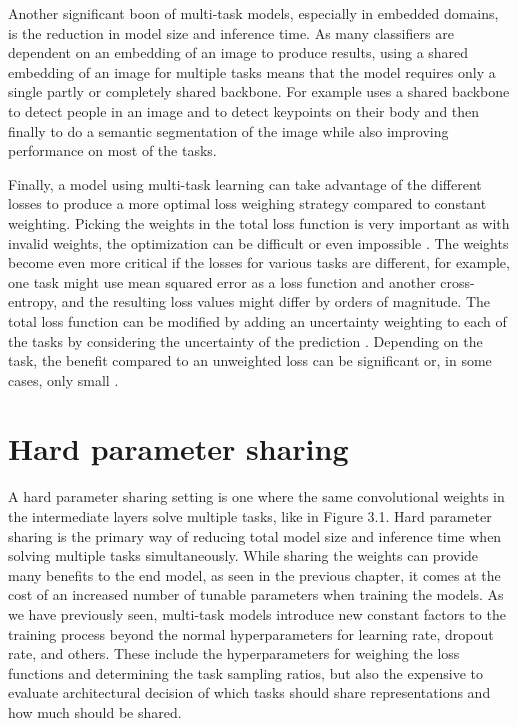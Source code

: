 Another significant boon of multi-task models, especially in embedded domains, is the reduction in model size and inference time.
As many classifiers are dependent on an embedding of an image to produce results, using a shared embedding of an image for multiple tasks means that the model requires only a single partly or completely shared backbone.
For example \citep{multiPoseNet} uses a shared backbone to detect people in an image and to detect keypoints on their body and then finally to do a semantic segmentation of the image while also improving performance on most of the tasks.

Finally, a model using multi-task learning can take advantage of the different losses to produce a more optimal loss weighing strategy compared to constant weighting.
Picking the weights in the total loss function is very important as with invalid weights, the optimization can be difficult or even impossible \citep{lossWeighting}.
The weights become even more critical if the losses for various tasks are different, for example, one task might use mean squared error as a loss function and another cross-entropy, and the resulting loss values might differ by orders of magnitude.
The total loss function can be modified by adding an uncertainty weighting to each of the tasks by considering the uncertainty of the prediction \citep{usingUncertaintyToWeighLosses}.
Depending on the task, the benefit compared to an unweighted loss can be significant \citep{usingUncertaintyToWeighLosses} or, in some cases, only small \citep{lossWeighting}.

\section{Hard parameter sharing}
A hard parameter sharing setting is one where the same convolutional weights in the intermediate layers solve multiple tasks, like in Figure 3.1.
Hard parameter sharing is the primary way of reducing total model size and inference time when solving multiple tasks simultaneously.
While sharing the weights can provide many benefits to the end model, as seen in the previous chapter, it comes at the cost of an increased number of tunable parameters when training the models.
As we have previously seen, multi-task models introduce new constant factors to the training process beyond the normal hyperparameters for learning rate, dropout rate, and others.
These include the hyperparameters for weighing the loss functions and determining the task sampling ratios, but also the expensive to evaluate architectural decision of which tasks should share representations and how much should be shared.

